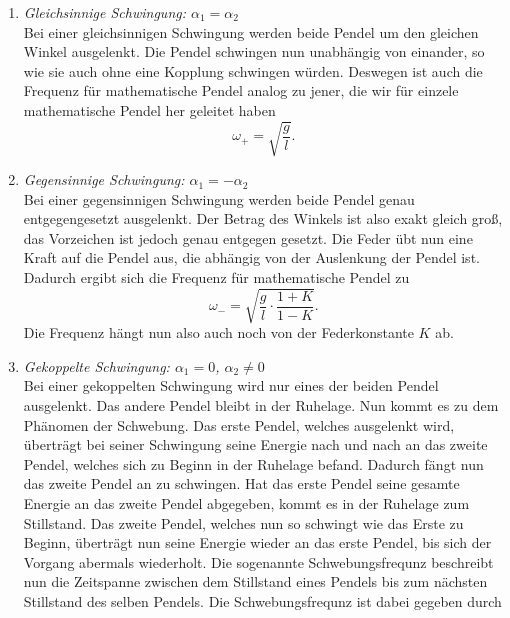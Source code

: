 \begin{enumerate}
  \item \textit{Gleichsinnige Schwingung: $\alpha_1=\alpha_2$} \\
        Bei einer gleichsinnigen Schwingung werden beide Pendel um den gleichen Winkel ausgelenkt. Die Pendel schwingen nun unabhängig von einander,
        so wie sie auch ohne eine Kopplung schwingen würden. Deswegen ist auch die Frequenz für mathematische Pendel analog zu jener, die wir für einzele
        mathematische Pendel her geleitet haben
        \begin{equation}
          \label{eq:omega_plus}
          \omega_{+}=\sqrt{\frac{g}{l}}.
        \end{equation}
  \item \textit{Gegensinnige Schwingung: $\alpha_1=-\alpha_2$}\\
        Bei einer gegensinnigen Schwingung werden beide Pendel genau entgegengesetzt ausgelenkt. Der Betrag des Winkels ist also exakt gleich groß, das Vorzeichen
        ist jedoch genau entgegen gesetzt. Die Feder übt nun eine Kraft auf die Pendel aus, die abhängig von der Auslenkung der Pendel ist. Dadurch ergibt sich die
        Frequenz für mathematische Pendel zu
        \begin{equation}
          \label{eq:omega_minus}
          \omega_{-}=\sqrt{\frac{g}{l} \cdot \frac{1+ K}{1-K}}.
        \end{equation}
        Die Frequenz hängt nun also auch noch von der Federkonstante $K$ ab.
  \item \textit{Gekoppelte Schwingung: $\alpha_1=0$, $\alpha_2\neq 0$}\\
        Bei einer gekoppelten Schwingung wird nur eines der beiden Pendel ausgelenkt. Das andere Pendel bleibt in der Ruhelage. Nun kommt es zu dem Phänomen der
        Schwebung. Das erste Pendel, welches ausgelenkt wird, überträgt bei seiner Schwingung seine Energie nach und nach an das zweite Pendel, welches sich
        zu Beginn in der Ruhelage befand. Dadurch fängt nun das zweite Pendel an zu schwingen. Hat das erste Pendel seine gesamte Energie an das zweite Pendel
        abgegeben, kommt es in der Ruhelage zum Stillstand. Das zweite Pendel, welches nun so schwingt wie das Erste zu Beginn, überträgt nun seine Energie wieder
        an das erste Pendel, bis sich der Vorgang abermals wiederholt. Die sogenannte Schwebungsfrequnz beschreibt nun die Zeitspanne zwischen dem Stillstand eines
        Pendels bis zum nächsten Stillstand des selben Pendels. Die Schwebungsfrequnz ist dabei gegeben durch

\end{enumerate}
